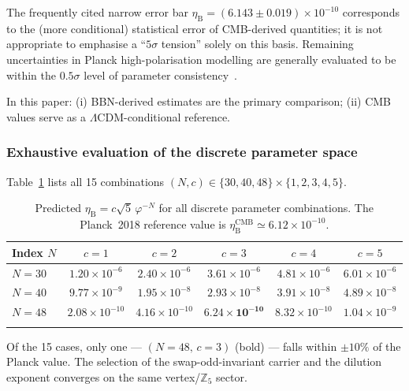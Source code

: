 \documentclass[sn-mathphys-num,Numbered]{sn-jnl}
\theoremstyle{thmstyleone}
\theoremstyle{thmstylethree}
\theoremstyle{thmstyletwo}
\newcommand{\etaB}{\eta_{\mathrm{B}}}
\begin{document}
The frequently cited narrow error bar
$\etaB = (6.143 \pm 0.019)\times10^{-10}$ corresponds to the
(more conditional) statistical error of CMB-derived quantities; it is
not appropriate to emphasise a ``$5\sigma$ tension'' solely on this
basis. Remaining uncertainties in Planck high-polarisation modelling are
generally evaluated to be within the $0.5\sigma$ level of parameter
consistency~\cite{Planck2018lensing}.

In this paper: (i) BBN-derived estimates are the primary comparison; (ii)
CMB values serve as a $\Lambda$CDM-conditional reference.

\subsubsection{Exhaustive evaluation of the discrete parameter space}
\label{sssec:exhaustive}

Table~\ref{tab:exhaustive} lists all 15 combinations
$(N,c) \in \{30,40,48\}\times\{1,2,3,4,5\}$.

\begin{table}[h]
\caption{Predicted $\etaB = c\sqrt{5}\,\varphi^{-N}$ for all discrete
parameter combinations. The Planck~2018 reference value is
$\etaB^{\mathrm{CMB}} \simeq 6.12\times10^{-10}$.}
\label{tab:exhaustive}
\begin{tabular}{@{}lccccc@{}}
\toprule
Index $N$ & $c=1$ & $c=2$ & $c=3$ & $c=4$ & $c=5$ \\
\midrule
$N=30$ &
  $1.20\times10^{-6}$ & $2.40\times10^{-6}$ & $3.61\times10^{-6}$ &
  $4.81\times10^{-6}$ & $6.01\times10^{-6}$ \\
$N=40$ &
  $9.77\times10^{-9}$ & $1.95\times10^{-8}$ & $2.93\times10^{-8}$ &
  $3.91\times10^{-8}$ & $4.89\times10^{-8}$ \\
$N=48$ &
  $2.08\times10^{-10}$ & $4.16\times10^{-10}$ & $\mathbf{6.24\times10^{-10}}$ &
  $8.32\times10^{-10}$ & $1.04\times10^{-9}$ \\
\botrule
\end{tabular}
\end{table}

Of the 15 cases, only one --- $(N=48,\,c=3)$ (bold) --- falls within
$\pm 10\%$ of the Planck value. The selection of the swap-odd-invariant
carrier and the dilution exponent converges on the same
vertex/$\mathbb{Z}_5$ sector.

\end{document}

